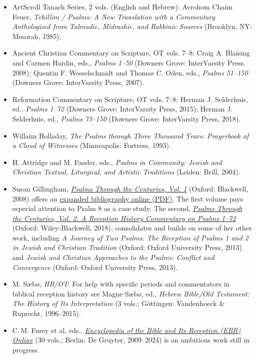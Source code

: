 \documentclass[titlepage]{article}
\begin{document}
\begin{itemize}

	\item ArtScroll Tanach Series, 2 vols. (English and Hebrew): Avrohom Chaim Feuer, \emph{Tehillim / Psalms: A New Translation with a Commentary Anthologized from Talmudic, Midrashic, and Rabbinic Sources} (Brooklyn, NY: Mesorah, 1985).

	\item Ancient Christian Commentary on Scripture, OT vols. 7--8:
	  Craig A. Blaising and Carmen Hardin, eds., \emph{Psalms 1--50} (Downers Grove: InterVarsity Press, 2008);
	  Quentin F. Wesselschmidt and Thomas C. Oden, eds., \emph{Psalms 51--150} (Downers Grove: InterVarsity Press, 2007).

	\item Reformation Commentary on Scripture, OT vols. 7--8:
	Herman J. Selderhuis, ed., \emph{Psalms 1--72} (Downers Grove: InterVarsity Press, 2015);
	Herman J. Selderhuis, ed., \emph{Psalms 73--150} (Downers Grove: InterVarsity Press, 2018).

	\item Willaim Holladay, \emph{The Psalms through Three Thousand Years: Prayerbook of a Cloud of Witnesses} (Minneapolis: Fortress, 1993).

	\item H. Attridge and M. Fassler, eds., \emph{Psalms in Community: Jewish and Christian Textual, Liturgical, and Artistic Traditions} (Leiden: Brill, 2004).

	\item Susan Gillingham, \emph{\href{https://onlinelibrary.wiley.com/doi/book/10.1002/9780470691748}{Psalms Through the Centuries, Vol. 1}} (Oxford: Blackwell, 2008) offers an \href{http://www.blackwellpublishing.com/pdf/9780631218555.pdf}{expanded bibliography online (PDF)}. The first volume pays especial attention to Psalm 8 as a case study. The second, \emph{\href{https://onlinelibrary.wiley.com/doi/book/10.1002/9781118832196}{Psalms Through the Centuries, Vol. 2: A Reception History Commentary on Psalms 1–72}} (Oxford: Wiley-Blackwell, 2018), consolidates and builds on some of her other work, including \emph{A Journey of Two Psalms: The Reception of Psalms 1 and 2 in Jewish and Christian Tradition} (Oxford: Oxford University Press, 2013) and \emph{Jewish and Christian Approaches to the Psalms: Conflict and Convergence} (Oxford: Oxford University Press, 2013).

	\item M. Sæbø, \emph{HB/OT}: For help with specific periods and commentators in biblical reception history see Magne Sæbø, ed., \emph{Hebrew Bible/Old Testament: The History of Its Interpretation} (3 vols.; Göttingen: Vandenhoeck \& Ruprecht, 1996--2015).

	\item C.\,M. Furey et al, eds., \emph{\href{https://db-degruyter-com.eu1.proxy.openathens.net/db/ebr}{Encyclopedia of the Bible and Its Reception (EBR) Online}} (30 vols.; Berlin: De Gruyter, 2009–2024) is an ambitious work still in progress.

\end{itemize}
\end{document}
